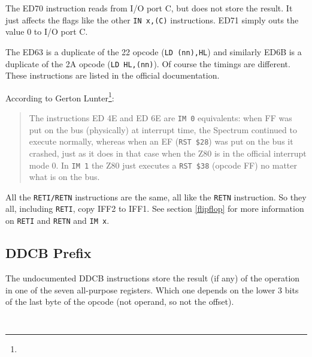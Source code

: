 \documentclass[12pt,twoside,openright,a4paper]{book}
\begin{document}
The ED70 instruction reads from I/O port C, but does not store the result. It just affects the flags like the other {\tt IN x,(C)} instructions. ED71 simply outs the value 0 to I/O port C.

The ED63 is a duplicate of the 22 opcode ({\tt LD (nn),HL}) and similarly ED6B is a duplicate of the 2A opcode ({\tt LD HL,(nn)}). Of course the timings are different. These instructions are listed in the official documentation.

According to Gerton Lunter\footnote{}:

\begin{quote}
	The instructions ED 4E and ED 6E are {\tt IM 0} equivalents: when FF was put on the bus (physically) at interrupt time, the Spectrum continued to execute normally, whereas when an EF ({\tt RST \$28}) was put on the bus it crashed, just as it does in that case when the Z80 is in the official interrupt mode 0. In {\tt IM 1} the Z80 just executes a {\tt RST \$38} (opcode FF) no matter what is on the bus.
\end{quote}

All the {\tt RETI/RETN} instructions are the same, all like the {\tt RETN} instruction. So they all, including {\tt RETI}, copy IFF2 to IFF1. See section \ref{flipflop} for more information on {\tt RETI} and {\tt RETN} and {\tt IM x}.


\subsection{DDCB Prefix}
\label{prefix_cbdd}

The undocumented DDCB instructions store the result (if any) of the operation in one of the seven all-purpose registers. Which one depends on the lower 3 bits of the last byte of the opcode (not operand, so not the offset).

{\tt
	\vspace*{1em}

	\begin{parcolumns}[colwidths={1=0.3\linewidth}]{2}
	\end{parcolumns}
}
\end{document}
